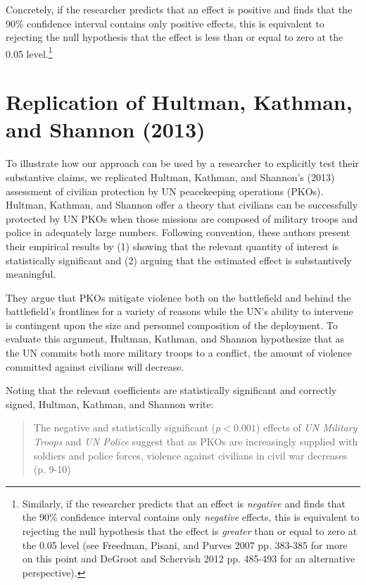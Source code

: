 \documentclass[12pt]{article}
\begin{document}
Concretely, if the researcher predicts that an effect is positive and finds that the 90\% confidence interval contains only positive effects, this is equivalent to rejecting the null hypothesis that the effect is less than or equal to zero at the 0.05 level.\footnote{Similarly, if the researcher predicts that an effect is \textit{negative} and finds that the 90\% confidence interval contains only \textit{negative} effects, this is equivalent to rejecting the null hypothesis that the effect is \textit{greater} than or equal to zero at the 0.05 level (see Freedman, Pisani, and Purves 2007 pp. 383-385 for more on this point and DeGroot and Schervish 2012 pp. 485-493 for an alternative perspective).}

\section*{Replication of Hultman, Kathman, and Shannon (2013)}

To illustrate how our approach can be used by a researcher to explicitly test their substantive claims, we replicated Hultman, Kathman, and Shannon's (2013) assessment of civilian protection by UN peacekeeping operations (PKOs). Hultman, Kathman, and Shannon offer a theory that civilians can be successfully protected by UN PKOs when those missions are composed of military troops and police in adequately large numbers. Following convention, these authors present their empirical results by (1) showing that the relevant quantity of interest is statistically significant and (2) arguing that the estimated effect is substantively meaningful.

They argue that PKOs mitigate violence both on the battlefield and behind the battlefield's frontlines for a variety of reasons while the UN's ability to intervene is contingent upon the size and personnel composition of the deployment. To evaluate this argument, Hultman, Kathman, and Shannon hypothesize that as the UN commits both more military troops to a conflict, the amount of violence committed against civilians will decrease.

Noting that the relevant coefficients are statistically significant and correctly signed, Hultman, Kathman, and Shannon write:

\begin{quote}
The negative and statistically significant ($p < 0.001$) effects of \textit{UN Military Troops} and \textit{UN Police} suggest that as PKOs are increasingly supplied with soldiers and police forces, violence against civilians in civil war decreases (p. 9-10)
\end{quote}
\end{document}

